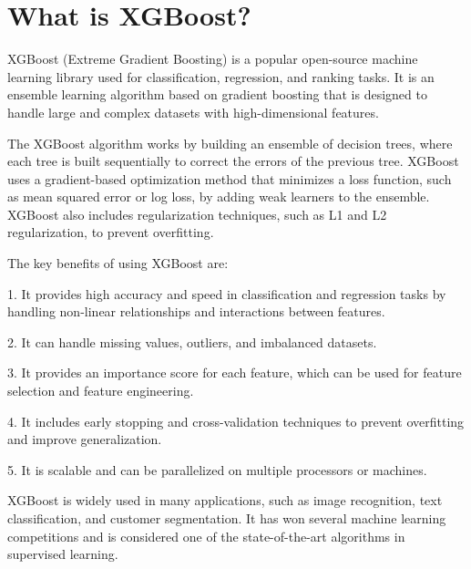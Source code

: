\section{What is XGBoost?}
XGBoost (Extreme Gradient Boosting) is a popular open-source machine learning library used for classification, regression, and ranking tasks. It is an ensemble learning algorithm based on gradient boosting that is designed to handle large and complex datasets with high-dimensional features.

The XGBoost algorithm works by building an ensemble of decision trees, where each tree is built sequentially to correct the errors of the previous tree. XGBoost uses a gradient-based optimization method that minimizes a loss function, such as mean squared error or log loss, by adding weak learners to the ensemble. XGBoost also includes regularization techniques, such as L1 and L2 regularization, to prevent overfitting.

The key benefits of using XGBoost are:

1. It provides high accuracy and speed in classification and regression tasks by handling non-linear relationships and interactions between features.

2. It can handle missing values, outliers, and imbalanced datasets.

3. It provides an importance score for each feature, which can be used for feature selection and feature engineering.

4. It includes early stopping and cross-validation techniques to prevent overfitting and improve generalization.

5. It is scalable and can be parallelized on multiple processors or machines.

XGBoost is widely used in many applications, such as image recognition, text classification, and customer segmentation. It has won several machine learning competitions and is considered one of the state-of-the-art algorithms in supervised learning.

